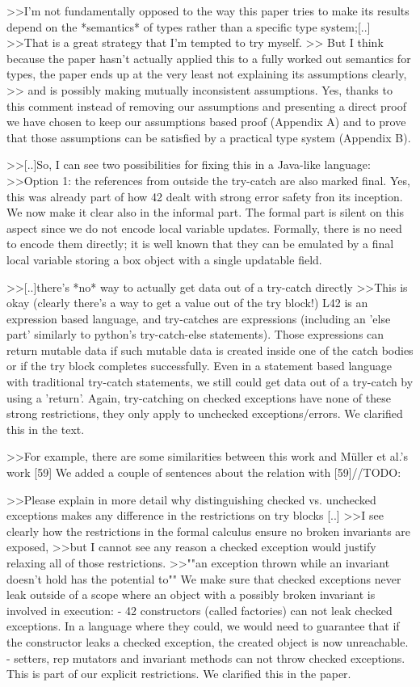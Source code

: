>>I'm not fundamentally opposed to the way this paper tries to make its results depend on the *semantics* of types rather than a specific type system;[..]
>>That is a great strategy that I'm tempted to try myself.
>> But I think because the paper hasn't actually applied this to a fully worked out semantics for types, the paper ends up at the very least not explaining its assumptions clearly,
>> and is possibly making mutually inconsistent assumptions. 
Yes, thanks to this comment instead of removing our assumptions and presenting a direct proof we have chosen to keep our assumptions based proof (Appendix A)
and to prove that those assumptions can be satisfied by a practical type system (Appendix B).


>>[..]So, I can see two possibilities for fixing this in a Java-like language:
>>Option 1: the references from outside the try-catch are also marked final.
Yes, this was already part of how 42 dealt with strong error safety fron its inception. We now make it clear also in the informal part.
The formal part is silent on this aspect since we do not encode local variable updates.
Formally, there is no need to encode them directly; it is well known that they can be emulated by a final local variable storing a box object with a single updatable field.


>>[..]there's *no* way to actually get data out of a try-catch directly
>>This is okay (clearly there's a way to get a value out of the try block!)
L42 is an expression based language, and try-catches are expressions (including an 'else part' similarly to python's try-catch-else statements).
Those expressions can return mutable data if such mutable data is created inside one of the catch bodies or if the try block completes successfully.
Even in a statement based language with traditional try-catch statements, we still could get data out of a try-catch by using a 'return'.
Again, try-catching on checked exceptions have none of these strong restrictions, they only apply to unchecked exceptions/errors.
We clarified this in the text.

>>For example, there are some similarities between this work and Müller et al.'s work [59]
We added a couple of sentences about the relation with [59]//TODO:


>>Please explain in more detail why distinguishing checked vs. unchecked exceptions makes any difference in the restrictions on try blocks [..]
>>I see clearly how the restrictions in the formal calculus ensure no broken invariants are exposed,
>>but I cannot see any reason a checked exception would justify relaxing all of those restrictions.
>>""an exception thrown while an invariant doesn't hold has the potential to""
We make sure that checked exceptions never leak outside of a scope where an object with a possibly broken invariant is involved in execution: 
  - 42 constructors (called factories) can not leak checked exceptions. In a language where they could,
   we would need to guarantee that if the constructor leaks a checked exception, the created object is now unreachable.
  - setters, rep mutators and invariant methods can not throw checked exceptions. This is part of our explicit restrictions.
We clarified this in the paper.

